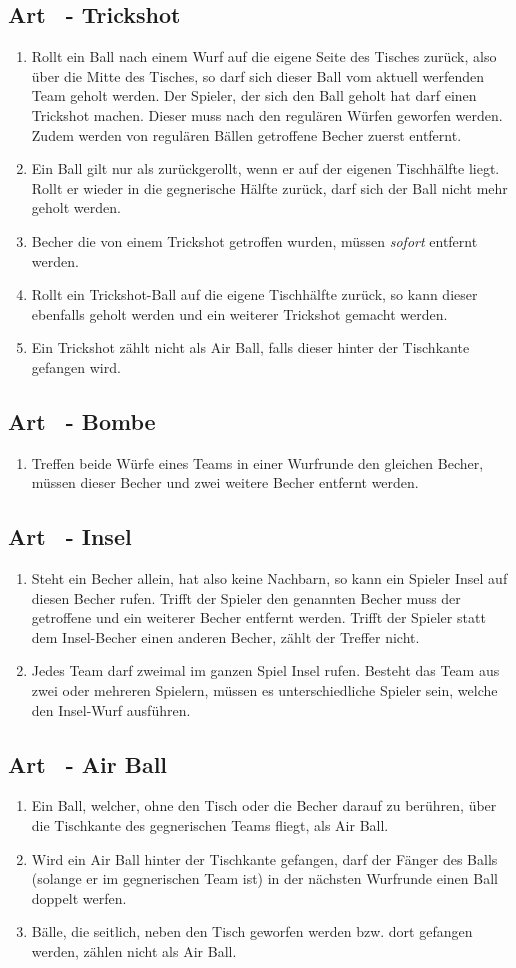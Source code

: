 \documentclass[a4paper,11pt]{scrartcl}
\newcommand{\enum}[1]{\begin{enumerate}[label=(\arabic*)]#1\end{enumerate}}
\newcommand{\art}[2]{\subsection*{#1} \enum{#2}}
\newcommand{\quot}[1]{\glqq #1\grqq}
\newcounter{art}
\begin{document}
    \art{Art \theart\ - \quot{Trickshot}}{
        \item
            Rollt ein Ball nach einem Wurf auf die eigene Seite des Tisches zurück, also über die Mitte des Tisches, so darf sich dieser Ball vom aktuell werfenden Team geholt werden. Der Spieler, der sich den Ball geholt hat darf einen \quot{Trickshot} machen. Dieser muss nach den regulären Würfen geworfen werden. Zudem werden von regulären Bällen getroffene Becher zuerst entfernt.
        \item
            Ein Ball gilt nur als zurückgerollt, wenn er auf der eigenen Tischhälfte liegt. Rollt er wieder in die gegnerische Hälfte zurück, darf sich der Ball nicht mehr geholt werden.
        \item
            Becher die von einem \quot{Trickshot} getroffen wurden, müssen \emph{sofort} entfernt werden.
        \item
            Rollt ein \quot{Trickshot}-Ball auf die eigene Tischhälfte zurück, so kann dieser ebenfalls geholt werden und ein weiterer \quot{Trickshot} gemacht werden.
        \item
            Ein \quot{Trickshot} zählt nicht als \quot{Air Ball}, falls dieser hinter der Tischkante gefangen wird.
    }

    \art{Art \theart\ - \quot{Bombe}}{
        \item
            Treffen beide Würfe eines Teams in einer Wurfrunde den gleichen Becher, müssen dieser Becher und zwei weitere Becher entfernt werden.
    }

    \art{Art \theart\ - \quot{Insel}}{
        \item
            Steht ein Becher allein, hat also keine Nachbarn, so kann ein Spieler \quot{Insel} auf diesen Becher rufen. Trifft der Spieler den genannten Becher muss der getroffene und ein weiterer Becher entfernt werden. Trifft der Spieler statt dem \quot{Insel}-Becher einen anderen Becher, zählt der Treffer nicht.
        \item
            Jedes Team darf zweimal im ganzen Spiel \quot{Insel} rufen. Besteht das Team aus zwei oder mehreren Spielern, müssen es unterschiedliche Spieler sein, welche den \quot{Insel}-Wurf ausführen.
    }

    \art{Art \theart\ - \quot{Air Ball}}{
        \item 
            Ein Ball, welcher, ohne den Tisch oder die Becher darauf zu berühren, über die Tischkante des gegnerischen Teams fliegt, als \quot{Air Ball}.
        \item
            Wird ein \quot{Air Ball} hinter der Tischkante gefangen, darf der Fänger des Balls (solange er im gegnerischen Team ist) in der nächsten Wurfrunde einen Ball doppelt werfen.
        \item
            Bälle, die seitlich, neben den Tisch geworfen werden bzw. dort gefangen werden, zählen nicht als \quot{Air Ball}.
    }
\end{document}
